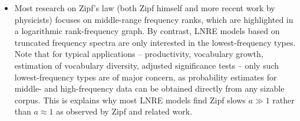 \documentclass[a4paper]{article}
\begin{document}
\begin{itemize}

\item Most research on Zipf's law (both Zipf himself and more recent work by physicists) focuses on middle-range frequency ranks, which are highlighted in a logarithmic rank-frequency graph.  By contrast, LNRE models \citep{Khmaladze:87,Baayen:01} based on truncated frequency spectra are only interested in the lowest-frequency types.  Note that for typical applications -- productivity, vocabulary growth, estimation of vocabulary diversity, adjusted significance tests -- only such lowest-frequency types are of major concern, as probability estimates for middle- and high-frequency data can be obtained directly from any sizable corpus.  This is explains why most LNRE models find Zipf slows $a \gg 1$ rather than $a\approx 1$ as observed by Zipf and related work.

\end{itemize}


  

\newpage
\listoftodos
\end{document}
